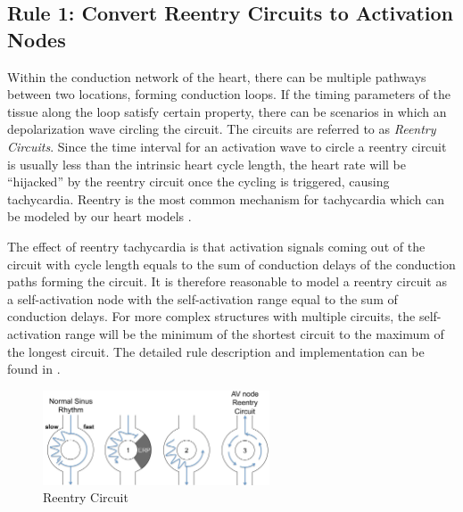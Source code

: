 




\subsection{Rule 1: Convert Reentry Circuits to Activation Nodes}
Within the conduction network of the heart, there can be multiple pathways between two locations, forming conduction loops. If the timing parameters of the tissue along the loop satisfy certain property, there can be scenarios in which an depolarization wave circling the circuit. The circuits are referred to as \emph{Reentry Circuits}. Since the time interval for an activation wave to circle a reentry circuit is usually less than the intrinsic heart cycle length, the heart rate will be "`hijacked"' by the reentry circuit once the cycling is triggered, causing tachycardia. Reentry is the most common mechanism for tachycardia which can be modeled by our heart models \cite{vhm_embc10}. 

The effect of reentry tachycardia is that activation signals coming out of the circuit with cycle length equals to the sum of conduction delays of the conduction paths forming the circuit. It is therefore reasonable to model a reentry circuit as a self-activation node with the self-activation range equal to the sum of conduction delays. For more complex structures with multiple circuits, the self-activation range will be the minimum of the shortest circuit to the maximum of the longest circuit. The detailed rule description and implementation can be found in \cite{regar_tech}.
\begin{figure}[!h]
		\centering
		\includegraphics[width=0.6\textwidth]{figs/reentry.pdf}
		\caption{\small Reentry Circuit}
		\label{fig:reentry}
\end{figure}

